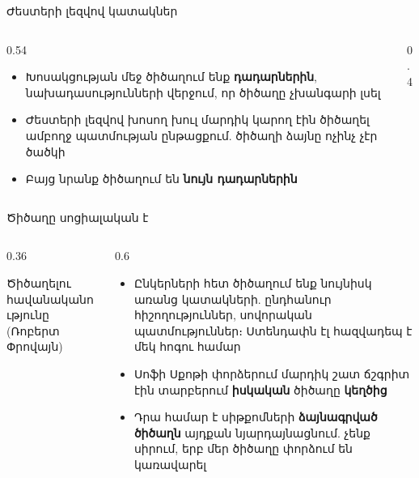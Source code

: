 \begin{frame}{Ժեստերի լեզվով կատակներ}
  \begin{columns}[c]
    \begin{column}{0.54\textwidth}
      \begin{itemize}
        \item Խոսակցության մեջ ծիծաղում ենք \textbf{դադարներին}, նախադասությունների վերջում, որ ծիծաղը չխանգարի լսել
        \item<2-> Ժեստերի լեզվով խոսող խուլ մարդիկ կարող էին ծիծաղել ամբողջ պատմության ընթացքում. ծիծաղի ձայնը ոչինչ չէր ծածկի
        \item<3-> Բայց նրանք ծիծաղում են \textbf{նույն դադարներին}
      \end{itemize}
    \end{column}
    \begin{column}{0.4\textwidth}
    \end{column}
  \end{columns}
\end{frame}

\begin{frame}{Ծիծաղը սոցիալական է}
  \begin{columns}[c]
    \begin{column}{0.36\textwidth}
      \centering
      \par
      {\scriptsize Ծիծաղելու հավանականությունը (Ռոբերտ Փրովայն)}
    \end{column}
    \begin{column}{0.6\textwidth}
      \begin{itemize}
        \item Ընկերների հետ ծիծաղում ենք նույնիսկ առանց կատակների. ընդհանուր հիշողություններ, սովորական պատմություններ։ Ստենդափն էլ հազվադեպ է մեկ հոգու համար
        \item<2-> Սոֆի Սքոթի փորձերում մարդիկ շատ ճշգրիտ էին տարբերում \textbf{իսկական} ծիծաղը \textbf{կեղծից}
        \item<3-> Դրա համար է սիթքոմների \textbf{ձայնագրված ծիծաղն} այդքան նյարդայնացնում. չենք սիրում, երբ մեր ծիծաղը փորձում են կառավարել
      \end{itemize}
    \end{column}
  \end{columns}
\end{frame}

